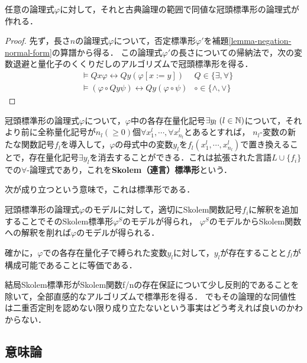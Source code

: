 \documentclass[uplatex, dvipdfmx]{jsreport}
\begin{document}
\begin{lemma}
    任意の論理式$\varphi$に対して，それと古典論理の範囲で同値な冠頭標準形の論理式が作れる．
\end{lemma}
\begin{proof}
    先ず，長さ$n$の論理式$\varphi$について，否定標準形$\varphi'$を補題\ref{lemma-negation-normal-form}の算譜から得る．
    この論理式$\varphi'$の長さについての帰納法で，次の変数退避と量化子のくくりだしのアルゴリズムで冠頭標準形を得る．
    \begin{align*}
        &\vDash Qx\varphi\leftrightarrow Qy(\varphi[x:=y]) &Q\in\{\exists,\forall\}\\
        &\vDash (\varphi\circ Qy\psi)\leftrightarrow Qy(\varphi\circ\psi) &\circ\in\{\land,\lor\}
    \end{align*}
\end{proof}

\begin{definition}
    冠頭標準形の論理式$\varphi$について，$\varphi$中の各存在量化記号$\exists y_l\;(l\in\mathbb{N})$について，それより前に全称量化記号が$n_l(\ge 0)$個$\forall x_1^l,\cdots,\forall x_{n_l}^l$とあるとすれば，
    $n_l$-変数の新たな関数記号$f_l$を導入して，$\varphi$の母式中の変数$y_l$を$f_l(x^l_1,\cdots,x^l_{n_l})$で置き換えることで，存在量化記号$\exists y_l$を消去することができる．これは拡張された言語$L\cup\{f_i\}$での$\forall$-論理式であり，これを\textbf{Skolem（連言）標準形}という．
\end{definition}
次が成り立つという意味で，これは標準形である．
\begin{proposition}\label{prop-Skolem-normal-form}
    冠頭標準形の論理式$\varphi$のモデルに対して，適切にSkolem関数記号$f_i$に解釈を追加することでそのSkolem標準形$\varphi^S$のモデルが得られ，
    $\varphi^S$のモデルからSkolem関数への解釈を削れば$\varphi$のモデルが得られる．
\end{proposition}
確かに，$\varphi$での各存在量化子で縛られた変数$y_l$に対して，$y_l$が存在することと$f_l$が構成可能であることに等価である．

\begin{screen}
    結局Skolem標準形がSkolem関数f/nの存在保証について少し反則的であることを除いて，全部直感的なアルゴリズムで標準形を得る．
    でもその論理的な同値性は二重否定則を認めない限り成り立たないという事実はどう考えれば良いのかわからない．
\end{screen}

\subsection{意味論}
\end{document}
